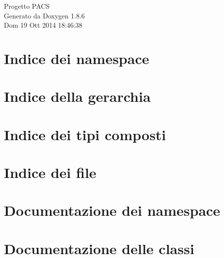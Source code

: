 \documentclass[twoside]{book}
\newcommand{\clearemptydoublepage}{%
  \newpage{\pagestyle{empty}\cleardoublepage}%
}
\begin{document}
\hypersetup{pageanchor=false}
\begin{titlepage}
\vspace*{7cm}
\begin{center}%
{\Large Progetto P\-A\-C\-S }\\
\vspace*{1cm}
{\large Generato da Doxygen 1.8.6}\\
\vspace*{0.5cm}
{\small Dom 19 Ott 2014 18:46:38}\\
\end{center}
\end{titlepage}
\clearemptydoublepage
\tableofcontents
\clearemptydoublepage
{}
\hypersetup{pageanchor=true}

\chapter{Indice dei namespace}

\chapter{Indice della gerarchia}

\chapter{Indice dei tipi composti}

\chapter{Indice dei file}

\chapter{Documentazione dei namespace}


\chapter{Documentazione delle classi}

















\end{document}
